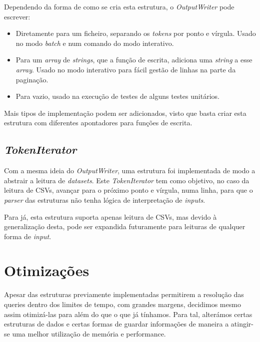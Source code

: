\documentclass{article}
\begin{document}
            Dependendo da forma de como se cria esta estrutura, o \textit{OutputWriter} pode escrever:
            \begin{itemize}
                \item Diretamente para um ficheiro, separando os \textit{tokens} por ponto e vírgula.
                Usado no modo \textit{batch} e num comando do modo interativo.
                
                \item Para um \textit{array} de \textit{strings}, que a função de escrita, adiciona uma \textit{string} a esse \textit{array}.
                Usado no modo interativo para fácil gestão de linhas na parte da paginação.
                \item Para vazio, usado na execução de testes de alguns testes unitários.
            \end{itemize}
            Mais tipos de implementação podem ser adicionados, visto que basta criar esta
            estrutura com diferentes apontadores para funções de escrita.
        \subsection{\textit{TokenIterator}}
            Com a mesma ideia do \textit{OutputWriter}, uma estrutura foi implementada de modo a abstrair a leitura de \textit{datasets}.
            Este \textit{TokenIterator} tem como objetivo, no caso da leitura de CSVs, avançar para o próximo ponto e vírgula, numa linha,
            para que o \textit{parser} das estruturas não tenha lógica de interpretação de \textit{inputs}.
            
            Para já, esta estrutura suporta apenas leitura de CSVs, mas devido à generalização desta, 
            pode ser expandida futuramente para leituras de qualquer forma de \textit{input}.

    \section{Otimizações}
        Apesar das estruturas previamente implementadas permitirem a resolução
        das queries dentro dos limites de tempo, com grandes margens, decidimos
        mesmo assim otimizá-las para além do que o que já tínhamos. Para tal, alterámos 
        certas estruturas de dados e certas formas de guardar informações de 
        maneira a atingir-se uma melhor utilização de memória e performance.
        
\end{document}

